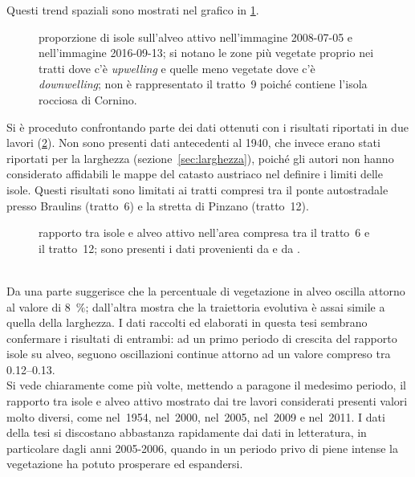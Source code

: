 Questi trend spaziali sono mostrati nel grafico in \cref{graph:rapp-isl-2008-2016}.
%
\begin{figure}
	\centering
	
	\caption[proporzione di isole sull'alveo attivo nel 2008-07-05 e nel 2016-09-13]{proporzione di isole sull'alveo attivo nell'immagine \AST{} 2008-07-05 e nell'immagine \Se{} 2016-09-13; si notano le zone più vegetate proprio nei tratti dove c'è \emph{upwelling} e quelle meno vegetate dove c'è \emph{downwelling}; non è rappresentato il tratto~9 poiché contiene l'isola rocciosa di Cornino.}
	\label{graph:rapp-isl-2008-2016}
\end{figure}
%

Si è proceduto confrontando parte dei dati ottenuti con i risultati riportati in due lavori  (\cref{graph:rapp-isl-vs-letteratura}).
Non sono presenti dati antecedenti al 1940, che invece erano stati riportati per la larghezza (sezione~\ref{sec:larghezza}), poiché gli autori non hanno considerato affidabili le mappe del catasto austriaco nel definire i limiti delle isole.
Questi risultati sono limitati ai tratti compresi tra il ponte autostradale presso Braulins (tratto~6) e la stretta di Pinzano (tratto~12).
%
\begin{figure}
	\centering
	
	\caption[rapporto tra isole e alveo attivo nell'area compresa tra il tratto~6 e il tratto~12]{rapporto tra isole e alveo attivo nell'area compresa tra il tratto~6 e il tratto~12; sono presenti i dati provenienti da  e da .}
	\label{graph:rapp-isl-vs-letteratura}
\end{figure}
%
\\
Da una parte  suggerisce che la percentuale di vegetazione in alveo oscilla attorno al valore di \SI{8}{\percent}; dall'altra  mostra che la traiettoria evolutiva è assai simile a quella della larghezza.
I dati raccolti ed elaborati in questa tesi sembrano confermare i risultati di entrambi: ad un primo periodo di crescita del rapporto isole su alveo, seguono oscillazioni continue attorno ad un valore compreso tra \numrange[range-phrase={ e }]{0.12}{0.13}.
\\
Si vede chiaramente come più volte, mettendo a paragone il medesimo periodo, il rapporto tra isole e alveo attivo mostrato dai tre lavori considerati presenti valori molto diversi, come nel~1954, nel~2000, nel~2005, nel~2009 e nel~2011.
I dati della tesi si discostano abbastanza rapidamente dai dati in letteratura, in particolare dagli anni 2005-2006, quando in un periodo privo di piene intense la vegetazione ha potuto prosperare ed espandersi.
